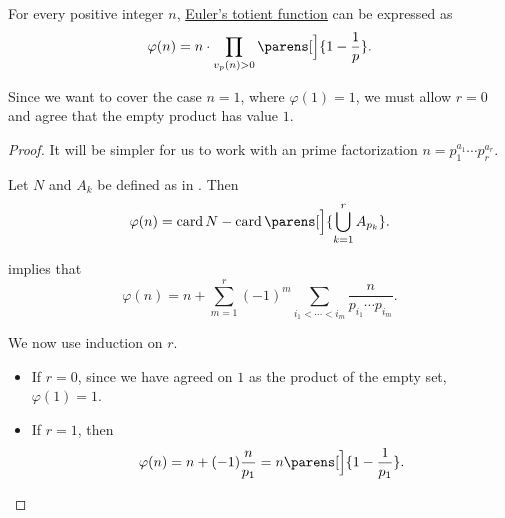 \begin{theorem}\label{thm:totient_function_product_formula}
  For every positive integer \( n \), \hyperref[def:eulers_totient_function]{Euler's totient function} can be expressed as
  \begin{equation}\label{eq:thm:totient_function_product_formula}
    \varphi(n) = n \cdot \prod_{v_p(n) > 0} \parens[\Big]{ 1 - \frac 1 p }.
  \end{equation}
\end{theorem}
\begin{comments}
  \item Since we want to cover the case \( n = 1 \), where \( \varphi(1) = 1 \), we must allow \( r = 0 \) and agree that the empty product has value \( 1 \).
\end{comments}
\begin{proof}
  It will be simpler for us to work with an prime factorization \( n = p_1^{a_1} \cdots p_r^{a_r} \).

  Let \( N \) and \( A_k \) be defined as in . Then
  \begin{equation*}
    \varphi(n) = \card N - \card\parens[\Big]{ \bigcup_{k=1}^r A_{p_k} }.
  \end{equation*}

   implies that
  \begin{equation}\label{eq:thm:totient_function_product_formula/intermediate}
    \varphi(n) = n + \sum_{m=1}^r (-1)^m \sum_{i_1 < \cdots < i_m} \frac n {p_{i_1} \cdots p_{i_m}}.
  \end{equation}

  We now use induction on \( r \).
  \begin{itemize}
    \item If \( r = 0 \), since we have agreed on \( 1 \) as the product of the empty set, \( \varphi(1) = 1 \).
    \item If \( r = 1 \), then
    \begin{equation*}
      \varphi(n) = n + (-1) \frac n {p_1} = n \parens[\Big]{ 1 - \frac 1 {p_1} }.
    \end{equation*}


\end{itemize}
\end{proof}

